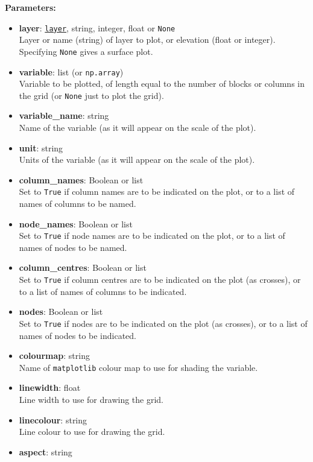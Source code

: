 \textbf{Parameters:}
\begin{itemize}
\item \textbf{layer}: \hyperref[layerobjects]{\texttt{layer}}, string, integer, float or \texttt{None}\\
  Layer or name (string) of layer to plot, or elevation (float or integer).  Specifying \texttt{None} gives a surface plot.
\item \textbf{variable}: list (or \texttt{np.array})\\
  Variable to be plotted, of length equal to the number of blocks or columns in the grid (or \texttt{None} just to plot the grid).
\item \textbf{variable\_name}: string\\
  Name of the variable (as it will appear on the scale of the plot).
\item \textbf{unit}: string\\
  Units of the variable (as it will appear on the scale of the plot).
\item \textbf{column\_names}: Boolean or list\\
  Set to \texttt{True} if column names are to be indicated on the plot, or to a list of names of columns to be named.
\item \textbf{node\_names}: Boolean or list\\
  Set to \texttt{True} if node names are to be indicated on the plot, or to a list of names of nodes to be named.
\item \textbf{column\_centres}: Boolean or list\\
  Set to \texttt{True} if column centres are to be indicated on the plot (as crosses), or to a list of names of columns to be indicated.
\item \textbf{nodes}: Boolean or list\\
  Set to \texttt{True} if nodes are to be indicated on the plot (as crosses), or to a list of names of nodes to be indicated.
\item \textbf{colourmap}: string\\
  Name of \texttt{matplotlib} colour map to use for shading the variable.
\item \textbf{linewidth}: float\\
  Line width to use for drawing the grid.
\item \textbf{linecolour}: string\\
  Line colour to use for drawing the grid.
\item \textbf{aspect}: string\\

\end{itemize}
